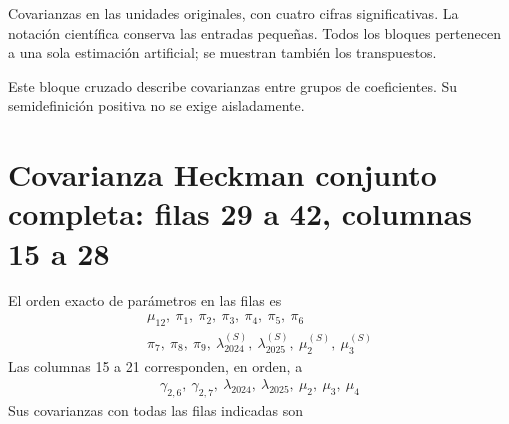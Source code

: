 \documentclass[11pt,a4paper]{article}
\begin{document}
Covarianzas en las unidades originales, con cuatro cifras significativas. La notación científica conserva las entradas pequeñas. Todos los bloques pertenecen a una sola estimación artificial; se muestran también los transpuestos.

Este bloque cruzado describe covarianzas entre grupos de coeficientes. Su semidefinición positiva no se exige aisladamente.

\clearpage
\section{Covarianza Heckman conjunto completa: filas 29 a 42, columnas 15 a 28}
El orden exacto de parámetros en las filas es
\[
\begin{gathered}\mu_12,\ \pi_1,\ \pi_2,\ \pi_3,\ \pi_4,\ \pi_5,\ \pi_6\\\pi_7,\ \pi_8,\ \pi_9,\ \lambda_{2024}^{(S)},\ \lambda_{2025}^{(S)},\ \mu_2^{(S)},\ \mu_3^{(S)}\end{gathered}
\]
Las columnas 15 a 21 corresponden, en orden, a
\[
\begin{gathered}\gamma_{2,6},\ \gamma_{2,7},\ \lambda_{2024},\ \lambda_{2025},\ \mu_2,\ \mu_3,\ \mu_4\end{gathered}
\]
Sus covarianzas con todas las filas indicadas son
\end{document}
